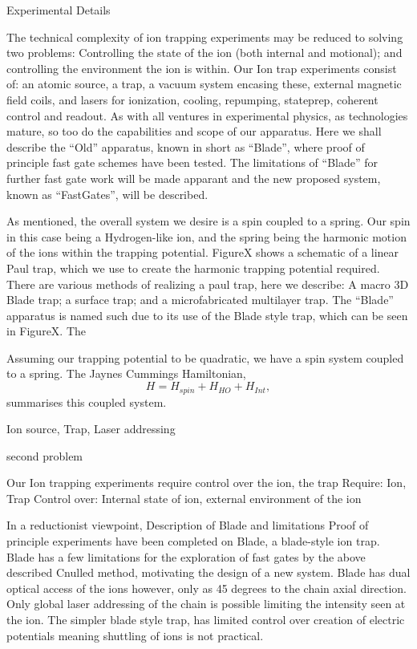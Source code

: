 
Experimental Details


\subtitle{Ion Trapping Apparatus}


The technical complexity of ion trapping experiments may be reduced to
solving two problems: Controlling the state of the ion (both internal
and motional); and controlling the environment the ion is within.
Our Ion trap experiments consist of: an atomic source, a trap, a
vacuum system encasing these, external magnetic field coils, and
lasers for ionization, cooling, repumping, stateprep, coherent
control and readout.
As with all ventures in experimental physics, as technologies mature, so
too do the capabilities and scope of our apparatus.  Here we shall
describe the ``Old'' apparatus, known in short as ``Blade'', where
proof of principle fast gate schemes have been tested. The limitations
of ``Blade'' for further fast gate work will be made apparant and
the new proposed system, known as ``FastGates'', will be described. 

\subtitle{Ion and Trap}

As mentioned, the overall system we desire is a spin coupled to a spring. Our spin in this case being a Hydrogen-like ion, and the spring being the harmonic motion of the ions within the trapping potential. FigureX shows a schematic of a linear Paul trap, which we use to create the harmonic trapping potential required. There are various methods of realizing a paul trap, here we describe: A macro 3D Blade trap; a surface trap; and a microfabricated multilayer trap. 
The ``Blade'' apparatus is named such due to its use of the Blade style trap, which can be seen in FigureX. The 

Assuming our trapping potential to be quadratic, we have a spin system coupled to a spring. The Jaynes Cummings Hamiltonian,
$$ H = H_{spin} + H_{HO} + H_{Int}, $$
summarises this coupled system.




Ion source,
Trap,
Laser addressing

second problem

Our Ion trapping experiments require control over the ion, the trap
Require:
Ion, Trap
Control over:
Internal state of ion, external environment of the ion

In a reductionist viewpoint, 
Description of Blade and limitations Proof of principle experiments
have been completed on Blade, a blade-style ion trap. Blade has a few
limitations for the exploration of fast gates by the above described
Cnulled method, motivating the design of a new system.  Blade has dual
optical access of the ions however, only as 45 degrees to the chain
axial direction. Only global laser addressing of the chain is possible
limiting the intensity seen at the ion. The simpler blade style trap,
has limited control over creation of electric potentials meaning
shuttling of ions is not practical.



